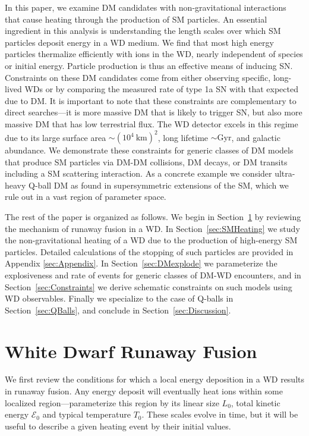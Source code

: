 \documentclass[twocolumn, preprintnumbers,amsmath,amssymb,prd, superscriptaddress]{revtex4}
\newcommand{\Ez}{\mathcal{E}_0}
\begin{document}
In this paper, we examine DM candidates with non-gravitational interactions that cause heating through the production of SM particles.
An essential ingredient in this analysis is understanding the length scales over which SM particles deposit energy in a WD medium.
We find that most high energy particles thermalize efficiently with ions in the WD, nearly independent of species or initial energy.
Particle production is thus an effective means of inducing SN.
Constraints on these DM candidates come from either observing specific, long-lived WDs or by comparing the measured rate of type 1a SN with that expected due to DM.
It is important to note that these constraints are complementary to direct searches---it is more massive DM that is likely to trigger SN, but also more massive DM that has low terrestrial flux.
The WD detector excels in this regime due to its large surface area $\sim (10^4 ~\text{km})^2$, long lifetime $\sim \text{Gyr}$, and galactic abundance.
We demonstrate these constraints for generic classes of DM models that produce SM particles via DM-DM collisions, DM decays, or DM transits including a SM scattering interaction.
As a concrete example we consider ultra-heavy Q-ball DM as found in supersymmetric extensions of the SM, which we rule out in a vast region of parameter space.

The rest of the paper is organized as follows.
We begin in Section~\ref{sec:Review} by reviewing the mechanism of runaway fusion in a WD.
In Section~\ref{sec:SMHeating} we study the non-gravitational heating of a WD due to the production of high-energy SM particles.
Detailed calculations of the stopping of such particles are provided in Appendix \ref{sec:Appendix}.
In Section~\ref{sec:DMexplode} we parameterize the explosiveness and rate of events for generic classes of DM-WD encounters, and in Section~\ref{sec:Constraints} we derive schematic constraints on such models using WD observables.
Finally we specialize to the case of Q-balls in Section~\ref{sec:QBalls}, and conclude in Section~\ref{sec:Discussion}.

\section{White Dwarf Runaway Fusion}
\label{sec:Review}

We first review the conditions for which a local energy deposition in a WD results in runaway fusion.
Any energy deposit will eventually heat ions within some localized region---parameterize this region by its linear size $L_0$, total kinetic energy $\Ez$ and typical temperature $T_0$.
These scales evolve in time, but it will be useful to describe a given heating event by their initial values.
\end{document}
